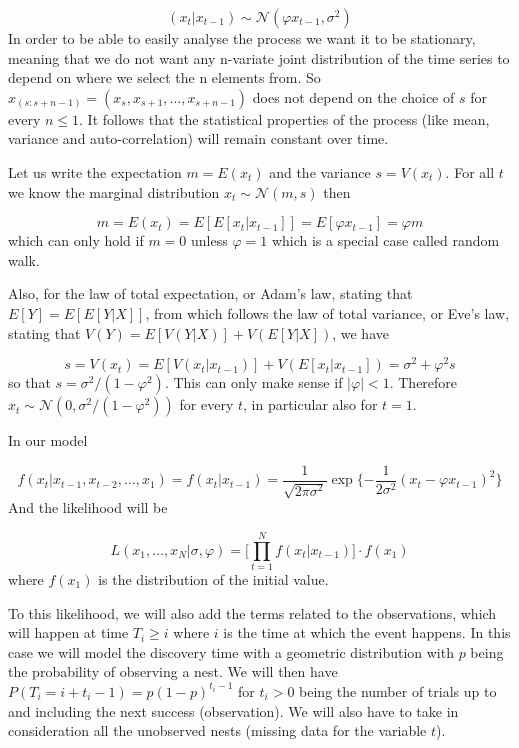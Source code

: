 \documentclass[11pt,a4paper]{article}
\begin{document}
\[
(x_{t} | x_{t-1}) \sim \mathcal{N} (\varphi x_{t-1}, \sigma^{2})
\]
In order to be able to easily analyse the process we want it to be stationary, meaning that we do not want any n-variate joint distribution of the time series to depend on where we select the n elements from. So $x_{(s:s+n-1)}= (x_s, x_{s+1},  \dots, x_{s+n-1})$ does not depend on the choice of $s$ for every $n \leq 1$.
It follows that the statistical properties of the process (like mean, variance and auto-correlation) will remain constant over time.

Let us write the expectation $m = E(x_t)$ and the variance $s = V(x_t)$. For all $t$ we know the marginal distribution $x_t \sim \mathcal{N}(m,s)$ then

\[
m = E(x_t) = E[E[x_t | x_{t-1}]] = E[\varphi x_{t-1}] = \varphi m
\]
which can only hold if $m = 0$ unless $\varphi = 1$ which is a special case called random walk.

Also, for the law of total expectation, or Adam's law, stating that $E[Y] = E[E[Y | X]]$, from which follows the law of total variance, or Eve's law, stating that $V(Y) = E[V(Y | X)] + V(E[Y | X])$, we have

\[
s = V(x_t) = E[V(x_t | x_{t-1})] + V(E[x_t | x_{t-1}]) = \sigma^2 + \varphi^2 s
\]
so that $s = \sigma^2 / ( 1 - \varphi^2 ) $. This can only make sense if $| \varphi | < 1$. Therefore $x_t \sim \mathcal{N}(0, \sigma^2 / ( 1 - \varphi^2 ) )$ for every $t$, in particular also for $t = 1$.

In our model

\[
f(x_{t} | x_{t-1} , x_{t-2}, \dots , x_{1}) = f(x_{t} | x_{t-1}) =  \frac{1}{\sqrt{2 \pi \sigma^{2}}} \exp \Bigg \{ { - \frac{1}{2 \sigma^{2}} }  (x_{t} - \varphi x_{t-1})^{2} \Bigg \}
\]
And the likelihood will be

\[
L(x_{1}, \dots , x_{N} | \sigma, \varphi) = \Bigg [ \prod_{t=1}^{N} f(x_{t} | x_{t-1}) \Bigg] \cdot f(x_{1})
\]
where $f(x_{1})$ is the distribution of the initial value.

To this likelihood, we will also add the terms related to the observations, which will happen at time $T_{i} \geq i$ where $i$ is the time at which the event happens. In this case we will model the discovery time with a geometric distribution with $p$ being the probability of observing a nest.  We will then have $P(T_{i} = i + t_i - 1) = p(1 - p)^{t_i - 1}$ for $t_i > 0$ being the number of trials up to and including the next success (observation). We will also have to take in consideration all the unobserved nests (missing data for the variable $t$).
\end{document}

